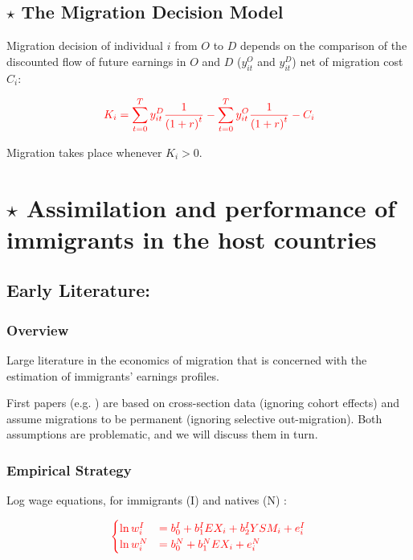     \subsection{$\star$ The Migration Decision Model}

        Migration decision of individual $i$ from $O$ to $D$ depends on the comparison of the discounted flow of future earnings in $O$ and $D$ ($y_{it}^O$ and $y_{it}^D$) net of migration cost $C_i$:
        
        \[\color{red} K_i = \sum_{t=0}^{T} y_{it}^D \frac{1}{{(1+r)}^t} - \sum_{t=0}^{T} y_{it}^O \frac{1}{{(1+r)}^t} - C_i\]

        Migration takes place whenever $K_i>0$.


\section{$\star$ Assimilation and performance of immigrants in the host countries}

    \subsection{Early Literature: \cite{chiswick_effect_1978}}

        \subsubsection{Overview}

            Large literature in the economics of migration that is concerned with the estimation of immigrants’ earnings profiles.
            
            First papers (e.g. \cite{chiswick_effect_1978}) are based on cross-section data (ignoring cohort effects) and assume migrations to be permanent (ignoring selective out-migration). Both assumptions are problematic, and we will discuss them in turn.

        \subsubsection{Empirical Strategy}

            Log wage equations, for immigrants (I) and natives (N) :

            \begin{equation*}
                \color{red}
                \begin{cases}
                    \ln w_{i}^I  & = b_{0}^I + b_{1}^IEX_{i} + b_{2}^IYSM_{i} + e_{i}^I \\
                    \ln w_{i}^N  & = b_{0}^N + b_{1}^NEX_{i} + e_{i}^N
                \end{cases}
            \end{equation*}

